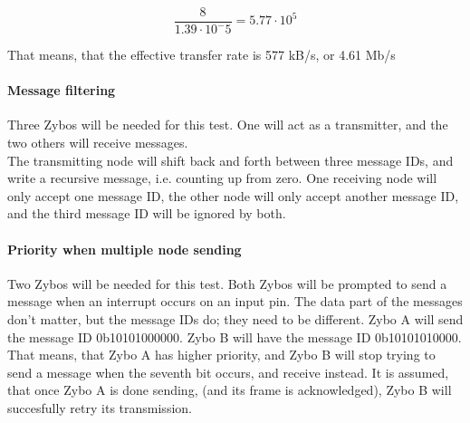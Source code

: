 \begin{equation}
\frac{8}{1.39 \cdot 10^-5}= 5.77 \cdot 10^5
\end{equation}

That means, that the effective transfer rate is 577 kB/s, or 4.61 Mb/s

\paragraph{Message filtering}
Three Zybos will be needed for this test.
One will act as a transmitter, and the two others will receive messages.\\
The transmitting node will shift back and forth between three message IDs, and write a recursive message, i.e. counting up from zero.
One receiving node will only accept one message ID, the other node will only accept another message ID, and the third message ID will be ignored by both.


\paragraph{Priority when multiple node sending}
Two Zybos will be needed for this test.
Both Zybos will be prompted to send a message when an interrupt occurs on an input pin. 
The data part of the messages don't matter, but the message IDs do; they need to be different.
Zybo A will send the message ID 0b10101000000.
Zybo B will have the message ID 0b10101010000.
That means, that Zybo A has higher priority, and Zybo B will stop trying to send a message when the seventh bit occurs, and receive instead.
It is assumed, that once Zybo A is done sending, (and its frame is acknowledged), Zybo B will succesfully retry its transmission. 